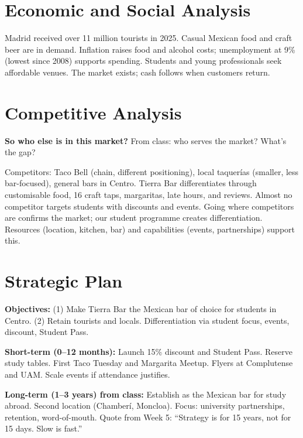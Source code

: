 \documentclass[11pt,a4paper]{article}
\begin{document}
\section{Economic and Social Analysis}

Madrid received over 11 million tourists in 2025. Casual Mexican food and craft beer are in demand. Inflation raises food and alcohol costs; unemployment at 9\% (lowest since 2008) supports spending. Students and young professionals seek affordable venues. The market exists; cash follows when customers return.

\vspace{1em}

\section{Competitive Analysis}

\textbf{So who else is in this market?} From class: who serves the market? What's the gap?

Competitors: Taco Bell (chain, different positioning), local taquer\'ias (smaller, less bar-focused), general bars in Centro. Tierra Bar differentiates through customisable food, 16 craft taps, margaritas, late hours, and reviews. Almost no competitor targets students with discounts and events. Going where competitors are confirms the market; our student programme creates differentiation. Resources (location, kitchen, bar) and capabilities (events, partnerships) support this.

\vspace{1em}

\section{Strategic Plan}

\textbf{Objectives:} (1) Make Tierra Bar the Mexican bar of choice for students in Centro. (2) Retain tourists and locals. Differentiation via student focus, events, discount, Student Pass.

\textbf{Short-term (0--12 months):} Launch 15\% discount and Student Pass. Reserve study tables. First Taco Tuesday and Margarita Meetup. Flyers at Complutense and UAM. Scale events if attendance justifies.

\textbf{Long-term (1--3 years) from class:} Establish as the Mexican bar for study abroad. Second location (Chamber\'i, Moncloa). Focus: university partnerships, retention, word-of-mouth. Quote from Week 5: ``Strategy is for 15 years, not for 15 days. Slow is fast.''
\end{document}
